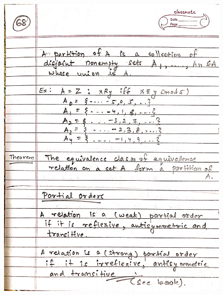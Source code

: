 \begin{figure}[H]
    \centering
    \includegraphics[scale=0.25]{"./MIT 6.042J/MIT_6042J_068"}
\end{figure}
\newpage
